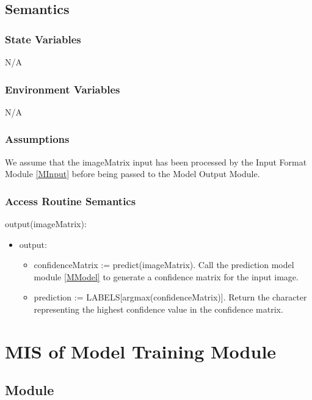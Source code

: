 \documentclass[12pt, titlepage]{article}
\begin{document}
\subsection{Semantics}

\subsubsection{State Variables}

N/A

\subsubsection{Environment Variables}

N/A

\subsubsection{Assumptions}

We assume that the imageMatrix input has been processed by the Input Format
Module \ref{MInput} before being passed to the Model Output Module.

\subsubsection{Access Routine Semantics}

\noindent output(imageMatrix):
\begin{itemize}
\item output:
\begin{itemize}
  \item confidenceMatrix := predict(imageMatrix). Call the prediction model
  module \ref{MModel} to generate a confidence matrix for the input image.
  \item prediction := LABELS[argmax(confidenceMatrix)]. Return the character
  representing the highest confidence value in the confidence matrix.
\end{itemize}
\end{itemize}

\newpage
\section{MIS of Model Training Module} \label{MTraining}

\subsection{Module}
\end{document}

